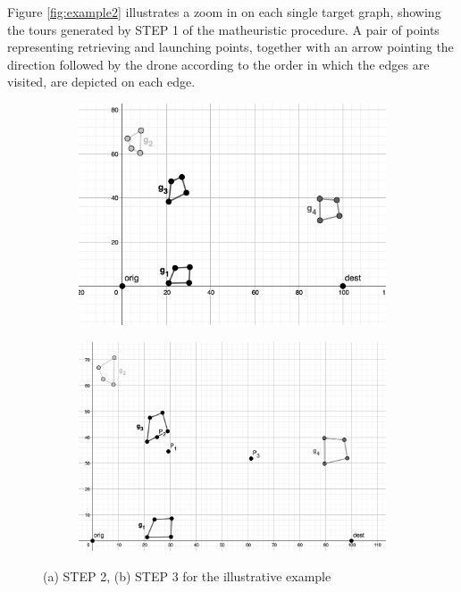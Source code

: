 \documentclass[10pt,a4paper]{elsarticle}
\newcommand{\EN}[1]{{\color{black}#1}}
\begin{document}
\noindent
Figure \ref{fig:example2} \EN{illustrates} a zoom \EN{in} on each single target graph, showing the tours generated by STEP 1 of the matheuristic procedure. A pair of points representing retrieving and launching points,  together with an arrow pointing the direction followed by the drone according to the order in which the edges are visited, are depicted on each edge.

\begin{figure}[h!]
	\centering
	\begin{subfigure}[b]{.4\textwidth}
		\includegraphics[width=\textwidth]{example_step2_new_gray.png}
		\caption{}%
	\end{subfigure}
	\begin{subfigure}[b]{.4\textwidth}
		\includegraphics[width=\textwidth]{example_step3_new_gray.png}
		\caption{}%
	\end{subfigure}
	\caption{(a) STEP 2, (b) STEP 3 for the illustrative example}%
	\label{fig:example3}%
\end{figure}
\end{document}
